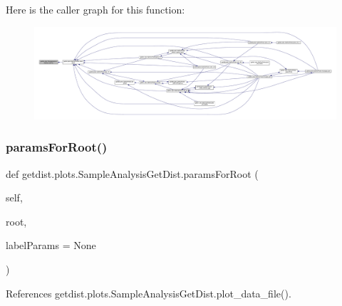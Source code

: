 Here is the caller graph for this function\+:
\nopagebreak
\begin{figure}[H]
\begin{center}
\leavevmode
\includegraphics[width=350pt]{classgetdist_1_1plots_1_1SampleAnalysisGetDist_a216dc4169528317eabebecce1fa974a4_icgraph}
\end{center}
\end{figure}
\mbox{\label{classgetdist_1_1plots_1_1SampleAnalysisGetDist_ab202e900c09abf868d57584be3cab79a}} 
\subsubsection{\texorpdfstring{params\+For\+Root()}{paramsForRoot()}}
{\footnotesize\ttfamily def getdist.\+plots.\+Sample\+Analysis\+Get\+Dist.\+params\+For\+Root (\begin{DoxyParamCaption}\item[{}]{self,  }\item[{}]{root,  }\item[{}]{label\+Params = {\ttfamily None} }\end{DoxyParamCaption})}



References getdist.\+plots.\+Sample\+Analysis\+Get\+Dist.\+plot\+\_\+data\+\_\+file().

